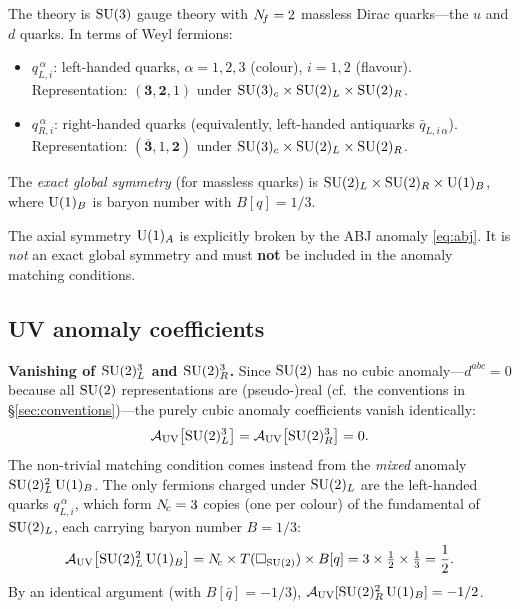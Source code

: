 \documentclass[11pt,a4paper]{article}
\begin{document}
The \UV{} theory is $\mathrm{SU}(3)$ gauge theory with $N_{\!f} = 2$ massless Dirac
quarks---the $u$ and $d$ quarks.  In terms of Weyl fermions:
\begin{itemize}
  \item $q_{L,i}^{\,\alpha}$: left-handed quarks,
    $\alpha = 1,2,3$ (colour), $i = 1,2$ (flavour).
    Representation: $(\mathbf{3}, \mathbf{2}, 1)$ under
    $\mathrm{SU}(3)_c \times \mathrm{SU}(2)_L \times \mathrm{SU}(2)_R$.
  \item $q_{R,i}^{\,\alpha}$: right-handed quarks (equivalently,
    left-handed antiquarks $\bar{q}_{L,i\,\alpha}$).
    Representation: $(\overline{\mathbf{3}}, 1, \mathbf{2})$ under
    $\mathrm{SU}(3)_c \times \mathrm{SU}(2)_L \times \mathrm{SU}(2)_R$.
\end{itemize}

The \emph{exact global symmetry} (for massless quarks) is
$\mathrm{SU}(2)_L \times \mathrm{SU}(2)_R \times \mathrm{U}(1)_B$, where $\mathrm{U}(1)_B$ is baryon
number with $B[q] = 1/3$.

\begin{warningbox}[title={$\UU{1}_A$ is anomalous}]
  The axial symmetry $\UU{1}_A$ is explicitly broken by the ABJ anomaly
  \eqref{eq:abj}.  It is \emph{not} an exact global symmetry and must
  \textbf{not} be included in the anomaly matching conditions.
\end{warningbox}

\subsection{UV anomaly coefficients}

\textbf{Vanishing of $\mathrm{SU}(2)_L^3$ and $\mathrm{SU}(2)_R^3$.}\;
Since $\mathrm{SU}(2)$ has no cubic anomaly---$d^{abc} = 0$ because all
$\mathrm{SU}(2)$ representations are (pseudo-)real (cf.\ the conventions in
\S\ref{sec:conventions})---the purely cubic anomaly coefficients
vanish identically:
\begin{equation}
  \mathcal{A}_{\mathrm{UV}}\bigl[\mathrm{SU}(2)_L^3\bigr]
  = \mathcal{A}_{\mathrm{UV}}\bigl[\mathrm{SU}(2)_R^3\bigr] = 0.
  \label{eq:uv-anomaly-su2L}
\end{equation}
The non-trivial matching condition comes instead from the
\emph{mixed} anomaly $\mathrm{SU}(2)_L^2\,\mathrm{U}(1)_B$.
The only fermions charged under $\mathrm{SU}(2)_L$ are the left-handed quarks
$q_{L,i}^{\,\alpha}$, which form $N_{\!c} = 3$ copies (one per colour) of the
fundamental of $\mathrm{SU}(2)_L$, each carrying baryon number $B = 1/3$:
\begin{equation}
  \mathcal{A}_{\mathrm{UV}}\bigl[\mathrm{SU}(2)_L^2\,\mathrm{U}(1)_B\bigr]
  = N_{\!c} \times T(\square_{\mathrm{SU}(2)}) \times B[q]
  = 3 \times \tfrac{1}{2} \times \tfrac{1}{3}
  = \frac{1}{2}.
  \label{eq:uv-anomaly-su2L-mixed}
\end{equation}
By an identical argument (with $B[\bar{q}] = -1/3$),
$\mathcal{A}_{\mathrm{UV}}[\mathrm{SU}(2)_R^2\,\mathrm{U}(1)_B] = -1/2$.
\end{document}
